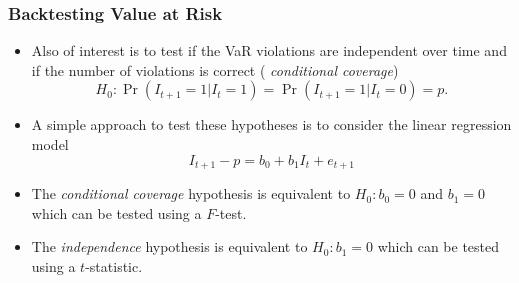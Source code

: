 \begin{frame}%

\frametitle{Backtesting Value at Risk}

\begin{itemize}
\item Also of interest is to test if the VaR violations are independent over
time and if the number of violations is correct (\emph{\color{red}%
conditional coverage})
\begin{equation*}
H_{0}:\Pr (I_{t+1}=1|I_{t}=1)=\Pr (I_{t+1}=1|I_{t}=0)=p.
\end{equation*}

\item A simple approach to test these hypotheses is to consider the linear
regression model
\begin{equation*}
I_{t+1}-p=b_{0}+b_{1}I_{t}+e_{t+1}
\end{equation*}

\item The \emph{\color{red}conditional coverage} hypothesis is equivalent to
$H_{0}:b_{0}=0$ and $b_{1}=0$ which can be tested using a $F$-test.

\item The \emph{\color{red}independence} hypothesis is equivalent to $%
H_{0}:b_{1}=0$ which can be tested using a $t$-statistic.
\end{itemize}

\end{frame}%

